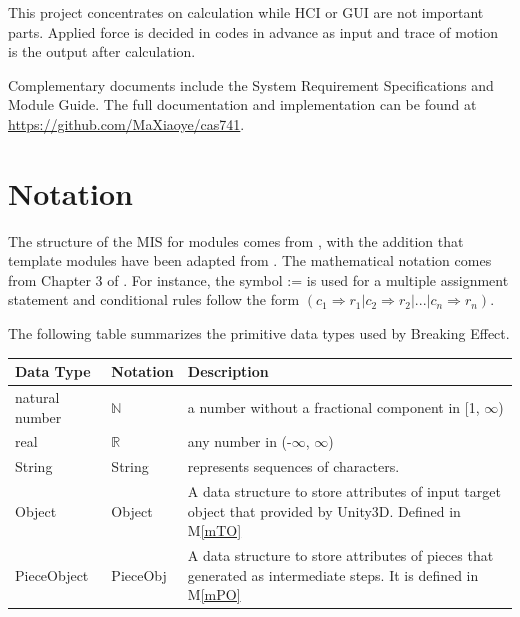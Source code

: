 \documentclass[12pt, titlepage]{article}
\newcommand{\mref}[1]{M\ref{#1}}
\newcommand{\progname}{Breaking Effect}
\begin{document}
This project concentrates on calculation while
HCI or GUI are not important parts. Applied force is decided in codes in advance as input
and trace of motion is the output after calculation.

Complementary documents include the System Requirement Specifications
and Module Guide.  The full documentation and implementation can be
found at \url{https://github.com/MaXiaoye/cas741}.

\section{Notation}

The structure of the MIS for modules comes from \citet{HoffmanAndStrooper1995},
with the addition that template modules have been adapted from
\cite{GhezziEtAl2003}.  The mathematical notation comes from Chapter 3 of
\citet{HoffmanAndStrooper1995}.  For instance, the symbol := is used for a
multiple assignment statement and conditional rules follow the form $(c_1
\Rightarrow r_1 | c_2 \Rightarrow r_2 | ... | c_n \Rightarrow r_n )$.

The following table summarizes the primitive data types used by \progname. 

\begin{center}
\renewcommand{\arraystretch}{1.2}
\noindent 
\begin{tabular}{l l p{7.5cm}} 
\toprule 
\textbf{Data Type} & \textbf{Notation} & \textbf{Description}\\ 
\midrule
natural number & $\mathbb{N}$ & a number without a fractional component in [1, $\infty$) \\
real & $\mathbb{R}$ & any number in (-$\infty$, $\infty$)\\
String & String & represents sequences of characters.\\
Object & Object & A data structure to store attributes of input target object that provided by Unity3D. Defined in \mref{mTO}\\
PieceObject & PieceObj & A data structure to store attributes of pieces that generated as intermediate steps. It is defined in \mref{mPO}\\
\bottomrule
\end{tabular} 
\end{center}

\end{document}
